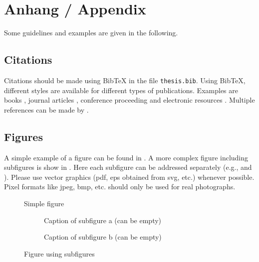 \chapter{Anhang / Appendix}

Some guidelines and examples are given in the following.

\section{Citations}

Citations should be made using BibTeX in the file \verb|thesis.bib|.
Using BibTeX, different styles are available for different types of publications. Examples are books \cite{Adams90}, journal articles \cite{Zhang99}, conference proceeding \cite{Yee99} and
electronic resources \cite{Fear05}. Multiple references can be made by \cite{Adams90,Zhang99,Yee99,Fear05}.


\section{Figures}

A simple example of a figure can be found in . A more complex figure including subfigures is show in . Here each subfigure can be addressed separately (e.g.,  and ). Please use vector graphics (pdf, eps obtained from svg, etc.) whenever possible. Pixel formats like jpeg, bmp, etc. should only be used for real photographs.

\begin{figure}[!h]
	\centering
	\fbox{\parbox{5cm}{\centering ~\vspace{1.5cm}\\Dummy\\~\vspace{1.5cm}}} %
	\caption{Simple figure}
	\label{fig:simple_figure}
\end{figure}

\begin{figure}[!h]
	\centering
	\begin{subfigure}[b]{7cm}
		\centering
		\fbox{\parbox{5cm}{\centering ~\vspace{1.5cm}\\Dummy\\~\vspace{1.5cm}}} %
		\caption{Caption of subfigure a (can be empty)}
		\label{fig:subfigure1}
	\end{subfigure}
	\begin{subfigure}[b]{7cm}
		\centering
		\fbox{\parbox{5cm}{\centering ~\vspace{1.5cm}\\Dummy\\~\vspace{1.5cm}}} %
		\caption{Caption of subfigure b (can be empty)}
		\label{fig:subfigure2}
	\end{subfigure}
	\caption{Figure using subfigures}
	\label{fig:figure_with_subfigures}
\end{figure}


